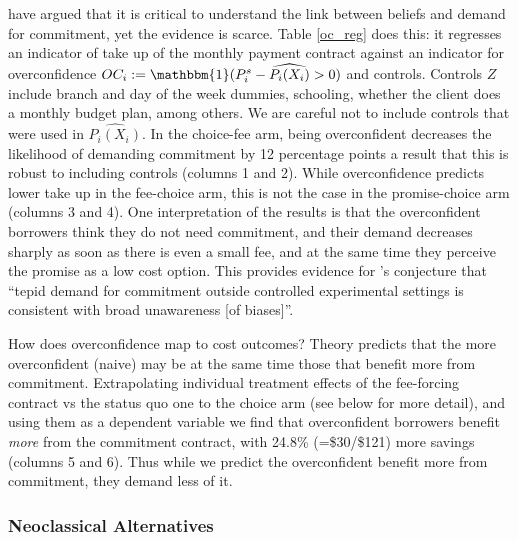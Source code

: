 \documentclass[oneside,11pt]{article}
\begin{document}
\cite{Sprenger} have argued that it is critical to understand the link between beliefs and demand for commitment, yet the evidence is scarce. Table \ref{oc_reg} does this: it regresses an indicator of take up of the monthly payment contract against an indicator for overconfidence $OC_i:=\mathbbm{1}(P^s_i-\widehat{P_i(X_i)}>0)$ and controls. Controls $Z$ include branch and day of the week dummies, schooling, whether the client does a monthly budget plan, among others. We are careful not to include controls that were used in $\widehat{P_i(X_i)}$. %
In the choice-fee arm, being overconfident decreases the likelihood of demanding commitment by 12 percentage points a result that this is robust to including controls  (columns 1 and 2). While overconfidence predicts lower take up in the fee-choice arm, this is not the case in the promise-choice arm (columns 3 and 4).  One interpretation of the results is that the overconfident borrowers think they do not need commitment, and their demand decreases sharply as soon as there is even a small fee, and at the same time they perceive the promise as a low cost option. This provides evidence for \cite{Sprenger}'s conjecture that ``tepid demand for commitment outside controlled experimental settings is consistent with broad unawareness [of biases]''. 

How does overconfidence map to cost outcomes? Theory predicts that the more overconfident (naive) may be at the same time those that benefit more from commitment. Extrapolating individual treatment effects of the fee-forcing contract vs the status quo one to the choice arm (see below for more detail), and using them as a dependent variable we find that overconfident borrowers benefit \textit{more} from the commitment contract, with 24.8\% (=\$30/\$121) more savings (columns 5 and 6). Thus while we predict the overconfident benefit more from commitment, they demand less of it. 



\subsubsection{Neoclassical Alternatives} \label{neoclasical}
\end{document}
